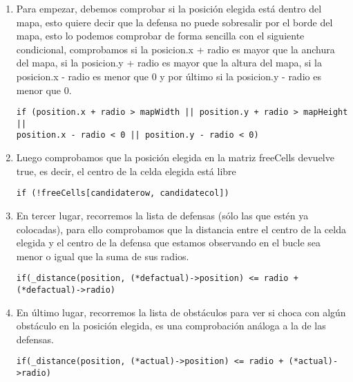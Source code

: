 \begin{enumerate}
    \item Para empezar, debemos comprobar si la posición elegida está dentro del mapa, esto quiere decir que la defensa no puede sobresalir por el borde del mapa, esto lo podemos comprobar de forma sencilla con el siguiente condicional, comprobamos si la posicion.x + radio es mayor que la anchura del mapa, si la posicion.y + radio es mayor que la altura del mapa, si la posicion.x - radio es menor que 0 y por último si la posicion.y - radio es menor que 0.
    \begin{lstlisting}
if (position.x + radio > mapWidth || position.y + radio > mapHeight ||
position.x - radio < 0 || position.y - radio < 0)
    \end{lstlisting}
    \item Luego comprobamos que la posición elegida en la matriz freeCells devuelve true, es decir, el centro de la celda elegida está libre
    \begin{lstlisting}
if (!freeCells[candidaterow, candidatecol]) 
    \end{lstlisting}
    \item En tercer lugar, recorremos la lista de defensas (sólo las que estén ya colocadas), para ello comprobamos que la distancia entre el centro de la celda elegida y el centro de la defensa que estamos observando en el bucle sea menor o igual que la suma de sus radios.
    \begin{lstlisting}
if(_distance(position, (*defactual)->position) <= radio + 
(*defactual)->radio)
    \end{lstlisting}
    \item En último lugar, recorremos la lista de obstáculos para ver si choca con algún obstáculo en la posición elegida, es una comprobación análoga a la de las defensas.
    \begin{lstlisting}
if(_distance(position, (*actual)->position) <= radio + (*actual)->radio)

    \end{lstlisting}
\end{enumerate}